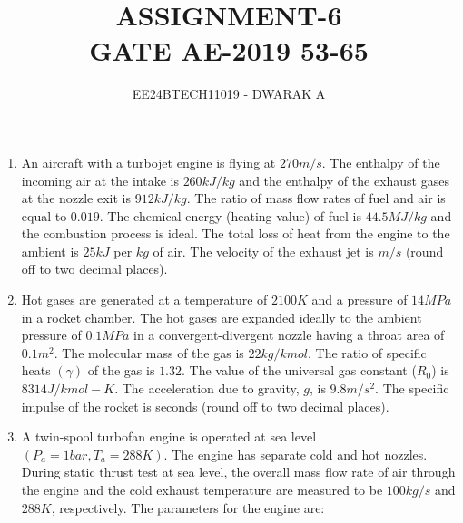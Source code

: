 \documentclass[journal]{IEEEtran}
\begin{document}

\vspace{3cm}

\title{\textbf{ASSIGNMENT-6\\GATE AE-2019 53-65}}
\author{EE24BTECH11019 - DWARAK A}
\maketitle

\bigskip

\renewcommand{\thefigure}{\theenumi}
\renewcommand{\thetable}{\theenumi}

\begin{enumerate}

\subsection*{Q.37 - Q.55 Numerical Answer Type (NAT), carry TWO mark each (no negative marks).}

    \item An aircraft with a turbojet engine is flying at $270 m/s$. The enthalpy of the incoming air at the intake is $260 kJ/kg$ and the enthalpy of the exhaust gases at the nozzle exit is $912 kJ/kg$. The ratio of mass flow rates of fuel and air is equal to $0.019$. The chemical energy (heating value) of fuel is $44.5 MJ/kg$ and the combustion process is ideal. The total loss of heat from the engine to the ambient is $25 kJ$ per $kg$ of air. The velocity of the exhaust jet is \underline{\hspace{1cm}} $m/s$ (round off to two decimal places).

    \item Hot gases are generated at a temperature of $2100 K$ and a pressure of $14 MPa$ in a rocket chamber. The hot gases are expanded ideally to the ambient pressure of $0.1 MPa$ in a convergent-divergent nozzle having a throat area of $0.1 m^2$. The molecular mass of the gas is $22 kg/kmol$. The ratio of specific heats $(\gamma)$ of the gas is $1.32$. The value of the universal gas constant ($R_0$) is $8314 J/kmol-K$. The acceleration due to gravity, $g$, is $9.8 m/s^2$. The specific impulse of the rocket is \underline{\hspace{1cm}} seconds (round off to two decimal places). 
    
    \item A twin-spool turbofan engine is operated at sea level $(P_{a} = 1 bar, T_{a} = 288 K)$. The engine has separate cold and hot nozzles. During static thrust test at sea level, the overall mass flow rate of air through the engine and the cold exhaust temperature are measured to be $100 kg/s$ and $288 K$, respectively. The parameters for the engine are:


\end{enumerate}
\end{document}
